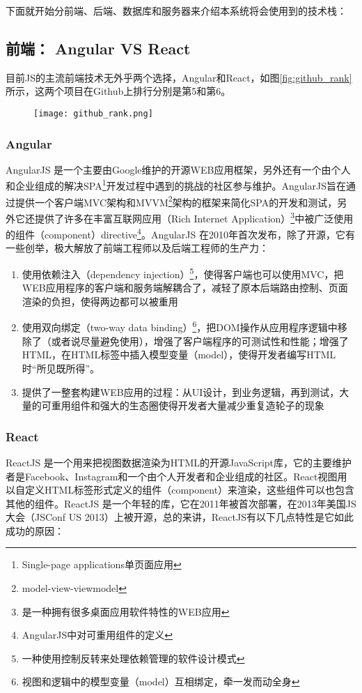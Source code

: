 下面就开始分前端、后端、数据库和服务器来介绍本系统将会使用到的技术栈：
\subsection{前端： Angular VS React}
目前JS的主流前端技术无外乎两个选择，Angular和React，如图\ref{fig:github_rank}所示，这两个项目在Github上排行分别是第5和第6。
\begin{figure}[!htp]
 \centering
 \texttt{[image: github\_rank.png]}
\end{figure}
\subsubsection{Angular}
AngularJS 是一个主要由Google维护的开源WEB应用框架，另外还有一个由个人和企业组成的解决SPA\footnote{Single-page applications单页面应用}开发过程中遇到的挑战的社区参与维护。AngularJS旨在通过提供一个客户端MVC架构和MVVM\footnote{model-view-viewmodel}架构的框架来简化SPA的开发和测试，另外它还提供了许多在丰富互联网应用（Rich Internet Application）\footnote{是一种拥有很多桌面应用软件特性的WEB应用 }中被广泛使用的组件（component）directive\footnote{AngularJS中对可重用组件的定义}。AngularJS 在2010年首次发布，除了开源，它有一些创举，极大解放了前端工程师以及后端工程师的生产力：
\begin{enumerate}
  \item 使用依赖注入（dependency injection）\footnote{一种使用控制反转来处理依赖管理的软件设计模式}，使得客户端也可以使用MVC，把WEB应用程序的客户端和服务端解耦合了，减轻了原本后端路由控制、页面渲染的负担，使得两边都可以被重用
  \item 使用双向绑定（two-way data binding）\footnote{视图和逻辑中的模型变量（model）互相绑定，牵一发而动全身}，把DOM操作从应用程序逻辑中移除了（或者说尽量避免使用），增强了客户端程序的可测试性和性能；增强了HTML，在HTML标签中插入模型变量（model），使得开发者编写HTML时“所见既所得”。
  \item 提供了一整套构建WEB应用的过程：从UI设计，到业务逻辑，再到测试，大量的可重用组件和强大的生态圈使得开发者大量减少重复造轮子的现象
\end{enumerate}

\subsubsection{React}
ReactJS 是一个用来把视图数据渲染为HTML的开源JavaScript库，它的主要维护者是Facebook、Instagram和一个由个人开发者和企业组成的社区。React视图用以自定义HTML标签形式定义的组件（component）来渲染，这些组件可以也包含其他的组件。ReactJS 是一个年轻的库，它在2011年被首次部署，在2013年美国JS大会（JSConf US 2013）上被开源，总的来讲，ReactJS有以下几点特性是它如此成功的原因：

